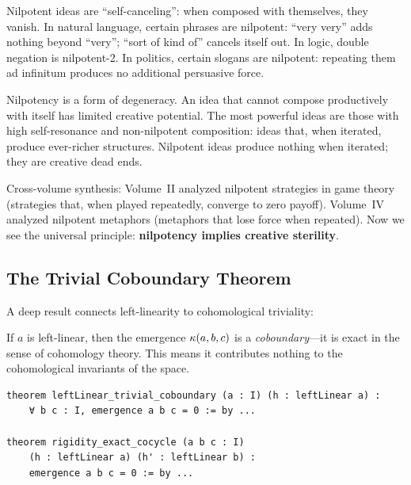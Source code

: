 \begin{interpretation}
Nilpotent ideas are ``self-canceling'': when composed with themselves, they
vanish. In natural language, certain phrases are nilpotent: ``very very''
adds nothing beyond ``very''; ``sort of kind of'' cancels itself out. In
logic, double negation is nilpotent-2. In politics, certain slogans are
nilpotent: repeating them ad infinitum produces no additional persuasive force.

Nilpotency is a form of degeneracy. An idea that cannot compose productively
with itself has limited creative potential. The most powerful ideas are those
with high self-resonance and non-nilpotent composition: ideas that,
when iterated, produce ever-richer structures. Nilpotent ideas produce
nothing when iterated; they are creative dead ends.

Cross-volume synthesis: Volume~II analyzed nilpotent strategies in game theory
(strategies that, when played repeatedly, converge to zero payoff). Volume~IV
analyzed nilpotent metaphors (metaphors that lose force when repeated). Now
we see the universal principle: \textbf{nilpotency implies creative sterility}.
\end{interpretation}

\subsection{The Trivial Coboundary Theorem}

A deep result connects left-linearity to cohomological triviality:

\begin{theorem}
\label{thm:trivial-coboundary}
If $a$ is left-linear, then the emergence $\kappa(a, b, c)$ is a
\emph{coboundary}---it is exact in the sense of cohomology theory. This means
it contributes nothing to the cohomological invariants of the space.
\end{theorem}

\begin{lstlisting}[caption={Coboundary theorem (IDT\_v3\_Emergence.lean)}]
theorem leftLinear_trivial_coboundary (a : I) (h : leftLinear a) :
    ∀ b c : I, emergence a b c = 0 := by ...

theorem rigidity_exact_cocycle (a b c : I)
    (h : leftLinear a) (h' : leftLinear b) :
    emergence a b c = 0 := by ...
\end{lstlisting}

